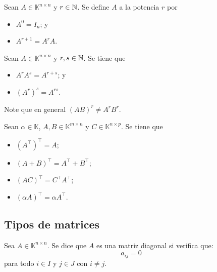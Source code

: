 \documentclass[a4,11pt]{aleph-notas}
\begin{document}
\begin{defi}
    Sean $A \in \mathbb{K}^{n \times n}$ y $r\in\mathbb{N}$. Se define $A$ a la potencia $r$ por
    \begin{itemize}
    \item 
        $A^0 = I_n$; y
    \item 
        $A^{r+1} = A^rA$.
    \end{itemize}
\end{defi}

\begin{teo}
    Sean $A \in \mathbb{K}^{n \times n}$ y $r,s\in\mathbb{N}$. Se tiene que
    \begin{itemize}
    \item 
        $A^r A^s = A^{r+s}$; y 
    \item 
        $(A^r)^s = A^{rs}$.
    \end{itemize}
\end{teo}

\begin{advertencia}
    Note que en general $(AB)^r \neq A^r B^r$.
\end{advertencia}


\begin{teo}
    Sean $\alpha \in \mathbb{K}$, $A,B\in\mathbb{K}^{m \times n}$ y  $C\in\mathbb{K}^{n \times p}$. Se tiene que
    \begin{itemize}
    \item 
        $\left(A^\intercal\right)^\intercal = A$;
    \item 
        $(A+B)^\intercal = A^\intercal + B^\intercal$;
    \item 
        $(AC)^\intercal = C^\intercal A^\intercal$;
    \item 
        $(\alpha A)^\intercal = \alpha A^\intercal$.
    \end{itemize}
\end{teo}

\subsection{Tipos de matrices}

\begin{defi}
    Sea $A\in \mathbb{K}^{n \times n}$. Se dice que $A$ es una matriz diagonal si verifica que:
    \[ 
        a_{ij} = 0
    \]
    para todo $i\in I$ y $j\in J$ con $i\neq j$.
\end{defi}
\end{document}
